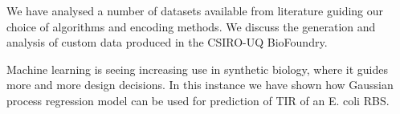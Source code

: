 We have analysed a number of datasets available from literature guiding our choice of algorithms and encoding methods. We discuss the generation and analysis of custom data produced in the CSIRO-UQ BioFoundry.

Machine learning is seeing increasing use in synthetic biology, where it guides more and more design decisions. In this instance we have shown how Gaussian process regression model can be used for prediction of TIR of an E. coli RBS.

